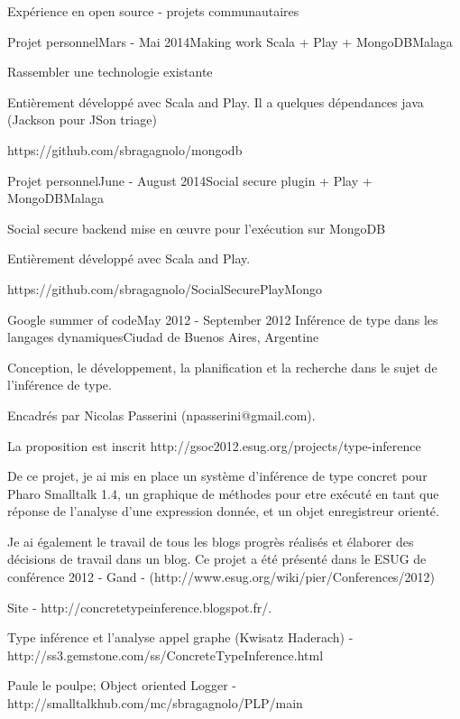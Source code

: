 \documentclass{resume} %
\begin{document}
\begin{rSection}{Exp\'{e}rience en open source - projets communautaires}

\begin{rSubsection}{Projet personnel}{Mars - Mai 2014}{Making work Scala + Play + MongoDB}{Malaga}
	\item Rassembler une technologie existante
	\item Enti\`{e}rement d\'{e}velopp\'{e} avec Scala and Play. Il a quelques d\'{e}pendances java (Jackson pour JSon triage)
	\item https://github.com/sbragagnolo/mongodb
\end{rSubsection}

\begin{rSubsection}{Projet personnel}{June - August 2014}{Social secure plugin + Play + MongoDB}{Malaga}
	\item Social secure backend mise en œuvre pour l'ex\'{e}cution sur MongoDB
	\item Enti\`{e}rement d\'{e}velopp\'{e} avec Scala and Play.
	\item https://github.com/sbragagnolo/SocialSecurePlayMongo
\end{rSubsection}


\begin{rSubsection}{Google summer of code}{May 2012 - September 2012}{
Inf\'{e}rence de type dans les langages dynamiques}{Ciudad de Buenos Aires, Argentine}
	\item Conception, le d\'{e}veloppement, la planification et la recherche dans le sujet de l'inf\'{e}rence de type.
	\item Encadr\'{e}s par Nicolas Passerini (npasserini@gmail.com).
	\item La proposition est inscrit http://gsoc2012.esug.org/projects/type-inference
	\item De ce projet, je ai mis en place un syst\`{e}me d'inf\'{e}rence de type concret pour Pharo Smalltalk 1.4, un graphique de m\'{e}thodes pour etre ex\'{e}cut\'{e} en tant que r\'{e}ponse de l'analyse d'une expression donn\'{e}e, et un objet enregistreur orient\'{e}.
	\item Je ai \'{e}galement le travail de tous les blogs progr\`{e}s r\'{e}alis\'{e}s et \'{e}laborer des d\'{e}cisions de travail dans un blog. Ce projet a \'{e}t\'{e} pr\'{e}sent\'{e} dans le ESUG de conf\'{e}rence 2012 - Gand - (http://www.esug.org/wiki/pier/Conferences/2012)
	\item Site - http://concretetypeinference.blogspot.fr/. 
	\item Type inf\'{e}rence et l'analyse appel graphe (Kwisatz Haderach) - http://ss3.gemstone.com/ss/ConcreteTypeInference.html
	\item Paule le poulpe; Object oriented Logger - http://smalltalkhub.com/mc/sbragagnolo/PLP/main
\end{rSubsection}


\end{rSection}
\end{document}
